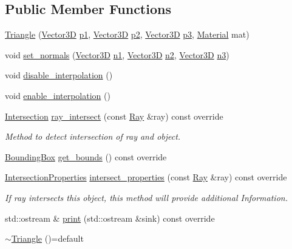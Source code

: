 \subsection*{Public Member Functions}
\begin{DoxyCompactItemize}
\item 
\mbox{\hyperlink{classTriangle_a4a1cc7d9d62014eb2453d18bbd05608f}{Triangle}} (\mbox{\hyperlink{classVector3D}{Vector3D}} \mbox{\hyperlink{classTriangle_a0461ba6ca1a0e1aa84062f93eacbe8b8}{p1}}, \mbox{\hyperlink{classVector3D}{Vector3D}} \mbox{\hyperlink{classTriangle_aa15acbc4f123f3e9e75e574566c2679a}{p2}}, \mbox{\hyperlink{classVector3D}{Vector3D}} \mbox{\hyperlink{classTriangle_a600c7366c1dad8996026742eb12434c6}{p3}}, \mbox{\hyperlink{classMaterial}{Material}} mat)
\item 
void \mbox{\hyperlink{classTriangle_a884c08e85751ea6204351718d3411034}{set\+\_\+normals}} (\mbox{\hyperlink{classVector3D}{Vector3D}} \mbox{\hyperlink{classTriangle_a51a16cfc88994c78e31340029bac777f}{n1}}, \mbox{\hyperlink{classVector3D}{Vector3D}} \mbox{\hyperlink{classTriangle_ab5786d87c9f548c1e8bb5937977dd0af}{n2}}, \mbox{\hyperlink{classVector3D}{Vector3D}} \mbox{\hyperlink{classTriangle_ae91046acca032af6fb931497127f8a7e}{n3}})
\item 
void \mbox{\hyperlink{classTriangle_a4465d15c66b5a61bfe3441b4e0676686}{disable\+\_\+interpolation}} ()
\item 
void \mbox{\hyperlink{classTriangle_a1a81c94f82103c8f1b81e006d8b03356}{enable\+\_\+interpolation}} ()
\item 
\mbox{\hyperlink{classIntersection}{Intersection}} \mbox{\hyperlink{classTriangle_a1ee77d1d4ddeae939e08711b30dbf4f0}{ray\+\_\+intersect}} (const \mbox{\hyperlink{classRay}{Ray}} \&ray) const override
\begin{DoxyCompactList}\small\item\em Method to detect intersection of ray and object. \end{DoxyCompactList}\item 
\mbox{\hyperlink{classBoundingBox}{Bounding\+Box}} \mbox{\hyperlink{classTriangle_ac93216ac2308504ab7dd7679e6b84937}{get\+\_\+bounds}} () const override
\item 
\mbox{\hyperlink{classIntersectionProperties}{Intersection\+Properties}} \mbox{\hyperlink{classTriangle_abbca4150897005e47c87758833479c87}{intersect\+\_\+properties}} (const \mbox{\hyperlink{classRay}{Ray}} \&ray) const override
\begin{DoxyCompactList}\small\item\em If ray intersects this object, this method will provide additional Information. \end{DoxyCompactList}\item 
std\+::ostream \& \mbox{\hyperlink{classTriangle_af5089786289dbeb3a5f41affb4edb569}{print}} (std\+::ostream \&sink) const override
\item 
\mbox{\hyperlink{classTriangle_a2b4c058428898080754e39009819ca38}{$\sim$\+Triangle}} ()=default
\end{DoxyCompactItemize}
